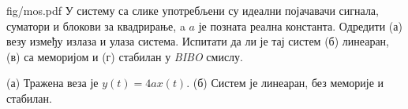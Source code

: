 \begin{slikaDesno}{fig/mos.pdf}
\PID
У систему са слике 
употребљени су идеални појачавачи сигнала, 
суматори и блокови за квадрирање, a $a$ је
позната реална константа. Одредити 
(а) везу између излаза и улаза система. 
Испитати да ли је тај систем (б) линеаран, 
(в) са меморијом и (г) стабилан у \textit{BIBO} смислу.
\end{slikaDesno}

\REZULTAT  (а) Тражена веза је 
$y(t) = 4a x(t)$. (б) Систем је линеаран, без меморије и стабилан.  